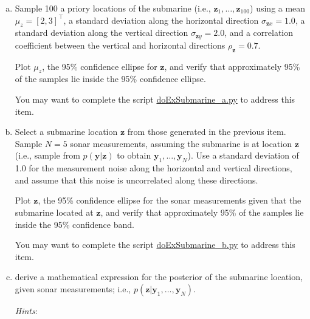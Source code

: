 \documentclass[12pt]{article}
\begin{document}
    \begin{enumerate}[(a)]

        \item Sample 100 a priory locations of the submarine
            (i.e., $\mathbf{z}_1,\ldots,\mathbf{z}_{100}$) using
            a mean $\mu_z=[2,3]^\intercal$, a standard deviation along the
            horizontal direction $\sigma_{\mathbf{z}x}=1.0$, a standard
            deviation along the vertical direction $\sigma_{\mathbf{z}y}=2.0$,
            and a correlation coefficient between the vertical and horizontal
            directions $\rho_{\mathbf{z}}=0.7$.

            Plot $\mu_z$, the 95\% confidence ellipse for $\mathbf{z}$, and
            verify that approximately 95\% of the samples lie inside the 95\%
            confidence ellipse.

            You may want to complete the script
            \href{http://github.com/joacorapela/gcnu\_bridging2023}{doExSubmarine\_a.py}
            to address this item.

        \item Select a submarine location $\mathbf{z}$ from those generated in
            the previous item. Sample $N=5$ sonar measurements, assuming the
            submarine is at location $\mathbf{z}$ (i.e., sample from
            $p(\mathbf{y}|\mathbf{z})$ to obtain
            $\mathbf{y}_1,\ldots,\mathbf{y}_N$). Use a standard deviation of
            1.0 for the measurement noise along the horizontal and vertical
            directions, and assume that this noise is uncorrelated along these
            directions.

            Plot $\mathbf{z}$, the 95\% confidence ellipse for the sonar
            measurements given that the submarine located at $\mathbf{z}$,
            and verify that approximately 95\% of the samples lie inside the
            95\% confidence band.

            You may want to complete the script
            \href{http://github.com/joacorapela/gcnu\_bridging2023}{doExSubmarine\_b.py}
            to address this item.

        \item derive a mathematical expression for the posterior of the
            submarine location, given sonar measurements; i.e.,
            $p(\mathbf{z}|\mathbf{y}_1,\ldots,\mathbf{y}_N)$.

            \textit{Hints}: 

            \begin{itemize}


\end{itemize}
\end{enumerate}
\end{document}
